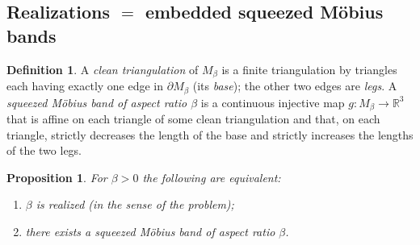 \documentclass[11pt]{article}
\newtheorem{proposition}{Proposition}
\theoremstyle{definition}
\newtheorem{definition}{Definition}
\newcommand{\R}{\mathbb{R}}
\newcommand{\bd}{\partial}
\begin{document}
\subsection{Realizations $=$ embedded squeezed M\"obius bands}

\begin{definition}\label{def:smb}
A \emph{clean triangulation} of $M_\beta$ is a finite triangulation by triangles each
having exactly one edge in $\bd M_\beta$ (its \emph{base}); the other two edges are
\emph{legs}. A \emph{squeezed M\"obius band of aspect ratio $\beta$} is a continuous
injective map $g:M_\beta\to\R^3$ that is affine on each triangle of some clean
triangulation and that, on each triangle, strictly decreases the length of the base and
strictly increases the lengths of the two legs.
\end{definition}

\begin{proposition}\label{prop:equiv}
For $\beta>0$ the following are equivalent:
\begin{enumerate}
\item[(a)] $\beta$ is realized (in the sense of the problem);
\item[(b)] there exists a squeezed M\"obius band of aspect ratio $\beta$.
\end{enumerate}
\end{proposition}
\end{document}
